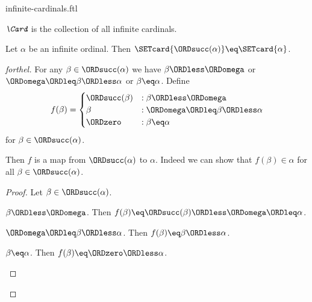 \documentclass{naproche-library}
\begin{document}
\begin{smodule}[title=Infinite Cardinal Numbers]{infinite-cardinals.ftl}

\begin{definition}[forthel,id=SET_THEORY_07_4231078585827328]
  $\emph{\Card}$ is the collection of all infinite cardinals.
\end{definition}

\begin{proposition}[forthel,id=SET_THEORY_07_8189062544359424]
  Let $\alpha$ be an infinite ordinal.
  Then $\SETcard{\ORDsucc(\alpha)} \eq \SETcard{\alpha}$.
\end{proposition}
\begin{proof}[forthel]
  For any $\beta \in \ORDsucc(\alpha)$ we have
  $\beta \ORDless \ORDomega$ or $\ORDomega \ORDleq \beta \ORDless \alpha$ or $\beta \eq \alpha$.
  Define \[ f(\beta) =
    \begin{cases}
      \ORDsucc(\beta)  & : \beta \ORDless \ORDomega
      \\
      \beta         & : \ORDomega \ORDleq \beta \ORDless \alpha
      \\
      \ORDzero             & : \beta \eq \alpha
    \end{cases} \]
  for $\beta \in \ORDsucc(\alpha)$.

  Then $f$ is a map from $\ORDsucc(\alpha)$ to $\alpha$.
  Indeed we can show that $f(\beta) \in \alpha$ for all
  $\beta \in \ORDsucc(\alpha)$.
  \begin{proof}
    Let $\beta \in \ORDsucc(\alpha)$.

    \begin{case}{$\beta \ORDless \ORDomega$.}
      Then $f(\beta)
        \eq \ORDsucc(\beta)
        \ORDless \ORDomega
        \ORDleq \alpha$.
    \end{case}

    \begin{case}{$\ORDomega \ORDleq \beta \ORDless \alpha$.}
      Then $f(\beta)
        \eq \beta
        \ORDless \alpha$.
    \end{case}

    \begin{case}{$\beta \eq \alpha$.}
      Then $f(\beta)
        \eq \ORDzero
        \ORDless \alpha$.
    \end{case}
  \end{proof}


\end{proof}
\end{smodule}
\end{document}
